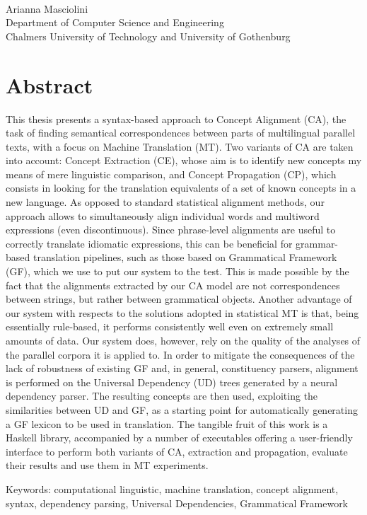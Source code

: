 \oneLineTitle\\
Arianna Masciolini\\
Department of Computer Science and Engineering\\
Chalmers University of Technology and University of Gothenburg\setlength{\parskip}{0.5cm}

\thispagestyle{plain}
\setlength{\parskip}{0pt plus 1.0pt}
\section*{Abstract}
This thesis presents a syntax-based approach to Concept Alignment (CA), the task of finding semantical correspondences between parts of multilingual parallel texts, with a focus on Machine Translation (MT).
Two variants of CA are taken into account: Concept Extraction (CE), whose aim is to identify new concepts my means of mere linguistic comparison, and Concept Propagation (CP), which consists in looking for the translation equivalents of a set of known concepts in a new language.
As opposed to standard statistical alignment methods, our approach allows to simultaneously align individual words and multiword expressions (even discontinuous). 
Since phrase-level alignments are useful to correctly translate idiomatic expressions, this can be beneficial for grammar-based translation pipelines, such as those based on Grammatical Framework (GF), which we use to put our system to the test. 
This is made possible by the fact that the alignments extracted by our CA model are not correspondences between strings, but rather between grammatical objects.
Another advantage of our system with respects to the solutions adopted in statistical MT is that, being essentially rule-based, it performs consistently well even on extremely small amounts of data.
Our system does, however, rely on the quality of the analyses of the parallel corpora it is applied to.
In order to mitigate the consequences of the lack of robustness of existing GF and, in general, constituency parsers, alignment is performed on the Universal Dependency (UD) trees generated by a neural dependency parser.
The resulting concepts are then used, exploiting the similarities between UD and GF, as a starting point for automatically generating a GF lexicon to be used in translation.
The tangible fruit of this work is a Haskell library, accompanied by a number of executables offering a user-friendly interface to perform both variants of CA, extraction and propagation, evaluate their results and use them in MT experiments.


\vfill
Keywords: computational linguistic, machine translation, concept alignment, syntax, dependency parsing, Universal Dependencies, Grammatical Framework

\newpage				%
\thispagestyle{empty}
\mbox{}